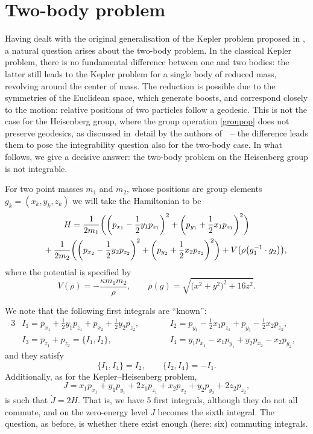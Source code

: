 \section{Two-body problem}

Having dealt with the original generalisation of the Kepler problem
proposed in \cite{1}, a natural question arises about the two-body
problem. In the classical Kepler problem, there is no fundamental
difference between one and two bodies: the latter still leads to the
Kepler problem for a single body of reduced mass, revolving around the
center of mass. The reduction is possible due to the symmetries of the Euclidean space, which generate boosts, and correspond closely to the motion: relative positions of two particles follow a geodesic. This is not the case for the Heisenberg group, where the group operation \eqref{groupop} does not preserve geodesics, as discussed in~detail by the authors of~\cite{1}~-- the difference leads them to pose the integrability question also for the two-body case. In what follows, we give a decisive answer: the two-body problem on the Heisenberg group is not integrable.

For two point masses $m_1$ and $m_2$, whose positions are group
elements $g_k = (x_k,y_k,z_k)$ we will take the Hamiltonian to be
\begin{gather}
 H = \frac{1}{2m_1}\bigg(\bigg(p_{x_1}-\frac12 y_1 p_{z_1}\bigg)^2
 + \bigg(p_{y_1}+\frac12 x_1 p_{z_1}\bigg)^2\bigg)\nonumber
 \\ \hphantom{H =}
 {}+ \frac{1}{2m_2}\bigg(\bigg(p_{x_2}-\frac12 y_2 p_{z_2}\bigg)^2 +
 \bigg(p_{y_2}+\frac12 x_2 p_{z_2}\bigg)^2\bigg) +
 V\big(\rho\big(g_1^{-1}\cdot g_2\big)\big),\label{eq:2b}
\end{gather}
where the potential is specified by
\begin{equation*}
 V(\rho) = -\frac{\kappa m_1 m_2}{\rho},\qquad
 \rho(g) = \sqrt{\big(x^2+y^2\big)^2+{16}z^2}.
\end{equation*}

We note that the following first integrals are ``known'':
\begin{alignat*}{3}
& I_1 = p_{x_1} +\frac12 y_1 p_{z_1} + p_{x_2} +\frac12 y_2 p_{z_2},
 \qquad&&
 I_2 = p_{y_1} -\frac12 x_1 p_{z_1} + p_{y_2} -\frac12 x_2 p_{z_2},&
 \\
 &I_3 = p_{z_1}+p_{z_2}=\{I_1,I_2\},
 \qquad&&
 I_4 = y_1 p_{x_1}-x_1 p_{y_1} + y_2 p_{x_2} - x_2 p_{y_2},&
\end{alignat*}
and they satisfy
\begin{equation*}
 \{I_1,I_4\}=I_2, \qquad
 \{I_2,I_4\} = -I_1.
\end{equation*}
Additionally, as for the Kepler--Heisenberg problem,
\begin{equation*}
 J = x_1 p_{x_1} + y_1 p_{y_1} + 2 z_1 p_{z_1} + x_2 p_{x_2} + y_2 p_{y_2} + 2 z_2 p_{z_2},
\end{equation*}
is such that $\dot{J}=2H$. That is, we have 5 first integrals,
although they do not all commute, and on the zero-energy level $J$
becomes the sixth integral. The question, as before, is whether there
exist enough (here: six) commuting integrals.

